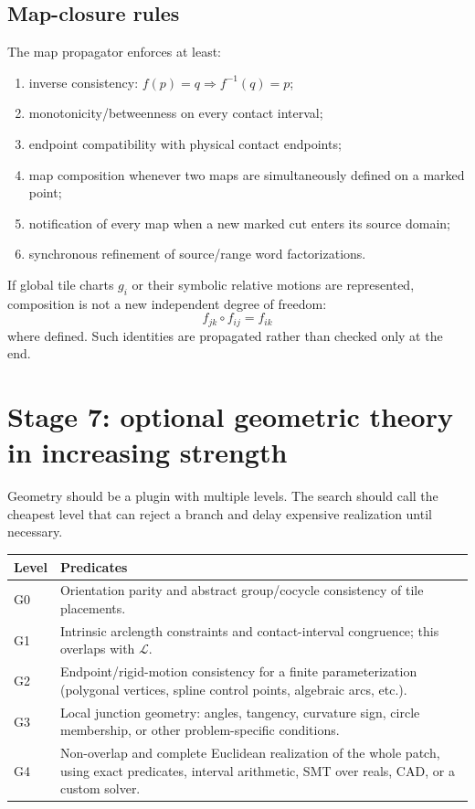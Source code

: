 \documentclass[11pt]{article}
\begin{document}
\subsection{Map-closure rules}

The map propagator enforces at least:
\begin{enumerate}[label=(M\arabic*)]
  \item inverse consistency: $f(p)=q\Rightarrow f^{-1}(q)=p$;
  \item monotonicity/betweenness on every contact interval;
  \item endpoint compatibility with physical contact endpoints;
  \item map composition whenever two maps are simultaneously defined on a marked point;
  \item notification of every map when a new marked cut enters its source domain;
  \item synchronous refinement of source/range word factorizations.
\end{enumerate}

If global tile charts $g_i$ or their symbolic relative motions are represented, composition is not a new independent degree of freedom:
\[
  f_{jk}\circ f_{ij}=f_{ik}
\]
where defined.  Such identities are propagated rather than checked only at the end.

\section{Stage 7: optional geometric theory in increasing strength}
\label{sec:geometry}

Geometry should be a plugin with multiple levels.  The search should call the cheapest level that can reject a branch and delay expensive realization until necessary.

\begin{longtable}{p{}p{}}
\toprule
Level & Predicates \\
\midrule
\endhead
G0 & Orientation parity and abstract group/cocycle consistency of tile placements. \\
G1 & Intrinsic arclength constraints and contact-interval congruence; this overlaps with $\mathcal L$. \\
G2 & Endpoint/rigid-motion consistency for a finite parameterization (polygonal vertices, spline control points, algebraic arcs, etc.). \\
G3 & Local junction geometry: angles, tangency, curvature sign, circle membership, or other problem-specific conditions. \\
G4 & Non-overlap and complete Euclidean realization of the whole patch, using exact predicates, interval arithmetic, SMT over reals, CAD, or a custom solver. \\
\bottomrule
\end{longtable}
\end{document}

